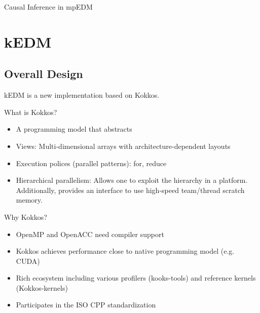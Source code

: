 \documentclass[conference]{IEEEtran}
\begin{document}
\begin{algorithm}[t]
    \SetAlgoLined
    \DontPrintSemicolon
    \BlankLine
    \caption{Causal Inference in mpEDM}
    \label{pseudo:mpedm}
\end{algorithm}

\section{kEDM}

\subsection{Overall Design}

kEDM is a new implementation based on Kokkos.

What is Kokkos?
\begin{itemize}
\item A programming model that abstracts
\item Views: Multi-dimensional arrays with architecture-dependent layouts
\item Execution polices (parallel patterns): for, reduce
\item Hierarchical parallelism: Allows one to exploit the hierarchy in a
    platform. Additionally, provides an interface to use high-speed
    team/thread scratch memory.
\end{itemize}

Why Kokkos?
\begin{itemize}
    \item OpenMP and OpenACC need compiler support
    \item Kokkos achieves performance close to native programming model (e.g. CUDA)
    \item Rich ecosystem including various profilers (kooks-tools) and reference kernels  (Kokkos-kernels)
    \item Participates in the ISO CPP standardization
\end{itemize}
\end{document}
